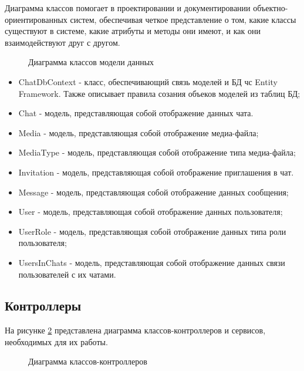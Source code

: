 Диаграмма классов помогает в проектировании и документировании объектно-ориентированных систем, обеспечивая четкое представление о том, какие классы существуют в системе, какие атрибуты и методы они имеют, и как они взаимодействуют друг с другом.

\begin{landscape}
	\begin{figure}[ht]
		\caption{Диаграмма классов модели данных}
		\label{data_model:image}
	\end{figure}
\end{landscape}

\begin{itemize}
	\item ChatDbContext - класс, обеспечивающий связь моделей и БД чс Entity Framework. Также описывает правила созания объеков моделей из таблиц БД;
	\item Chat - модель, представляющая собой отображение данных чата.
	\item Media - модель, представляющая собой отображение медиа-файла;
	\item MediaType - модель, представляющая собой отображение типа медиа-файла;
	\item Invitation - модель, представляющая собой отображение приглашения в чат.
	\item Message - модель, представляющая собой отображение данных сообщения;
	\item User - модель, представляющая собой отображение данных пользователя;
	\item UserRole - модель, представляющая собой отображение данных типа роли пользователя;
	\item UsersInChats - модель, представляющая собой отображение данных связи пользователей с их чатами.
\end{itemize}

\subsection{Контроллеры}

На рисунке \ref{controllers:image} представлена диаграмма классов-контроллеров и сервисов, необходимых для их работы.

\begin{landscape}
	\begin{figure}[ht]
		\caption{Диаграмма классов-контроллеров}
		\label{controllers:image}
	\end{figure}
\end{landscape}

